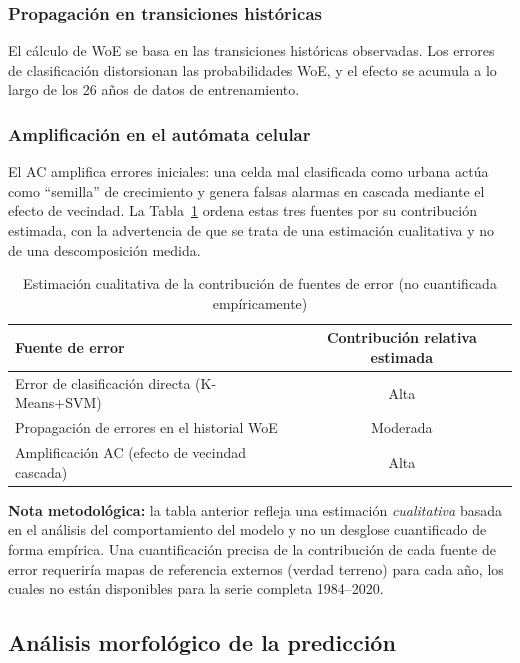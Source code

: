 \subsubsection{Propagación en transiciones históricas}

El cálculo de WoE se basa en las transiciones históricas observadas. Los errores de clasificación distorsionan las probabilidades WoE, y el efecto se acumula a lo largo de los 26 años de datos de entrenamiento.

\subsubsection{Amplificación en el autómata celular}

El AC amplifica errores iniciales: una celda mal clasificada como urbana actúa como ``semilla'' de crecimiento y genera falsas alarmas en cascada mediante el efecto de vecindad. La Tabla~\ref{tab:error_contribution} ordena estas tres fuentes por su contribución estimada, con la advertencia de que se trata de una estimación cualitativa y no de una descomposición medida.

\begin{table}[htbp]
\centering
\caption{Estimación cualitativa de la contribución de fuentes de error (no cuantificada empíricamente)}
\label{tab:error_contribution}
\begin{tabular}{lc}
\toprule
\textbf{Fuente de error} & \textbf{Contribución relativa estimada} \\
\midrule
Error de clasificación directa (K-Means+SVM) & Alta \\
Propagación de errores en el historial WoE & Moderada \\
Amplificación AC (efecto de vecindad cascada) & Alta \\
\bottomrule
\end{tabular}
\end{table}

\textbf{Nota metodológica:} la tabla anterior refleja una estimación \textit{cualitativa} basada en el análisis del comportamiento del modelo y no un desglose cuantificado de forma empírica. Una cuantificación precisa de la contribución de cada fuente de error requeriría mapas de referencia externos (verdad terreno) para cada año, los cuales no están disponibles para la serie completa 1984--2020.

\subsection{Análisis morfológico de la predicción}

